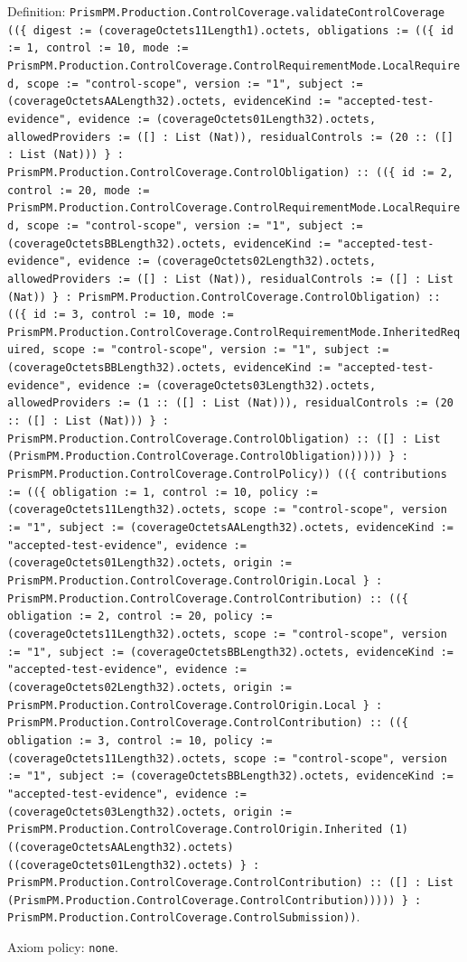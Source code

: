 \documentclass[11pt]{article}
\begin{document}
\noindent Definition: \texttt{PrismPM.Production.ControlCoverage.validateControlCoverage ((\{ digest := (coverageOctets11Length1).octets, obligations := ((\{ id := 1, control := 10, mode := PrismPM.Production.ControlCoverage.ControlRequirementMode.LocalRequired, scope := "control-scope", version := "1", subject := (coverageOctetsAALength32).octets, evidenceKind := "accepted-test-evidence", evidence := (coverageOctets01Length32).octets, allowedProviders := ([] : List (Nat)), residualControls := (20 :: ([] : List (Nat))) \} : PrismPM.Production.ControlCoverage.ControlObligation) :: ((\{ id := 2, control := 20, mode := PrismPM.Production.ControlCoverage.ControlRequirementMode.LocalRequired, scope := "control-scope", version := "1", subject := (coverageOctetsBBLength32).octets, evidenceKind := "accepted-test-evidence", evidence := (coverageOctets02Length32).octets, allowedProviders := ([] : List (Nat)), residualControls := ([] : List (Nat)) \} : PrismPM.Production.ControlCoverage.ControlObligation) :: ((\{ id := 3, control := 10, mode := PrismPM.Production.ControlCoverage.ControlRequirementMode.InheritedRequired, scope := "control-scope", version := "1", subject := (coverageOctetsBBLength32).octets, evidenceKind := "accepted-test-evidence", evidence := (coverageOctets03Length32).octets, allowedProviders := (1 :: ([] : List (Nat))), residualControls := (20 :: ([] : List (Nat))) \} : PrismPM.Production.ControlCoverage.ControlObligation) :: ([] : List (PrismPM.Production.ControlCoverage.ControlObligation))))) \} : PrismPM.Production.ControlCoverage.ControlPolicy)) ((\{ contributions := ((\{ obligation := 1, control := 10, policy := (coverageOctets11Length32).octets, scope := "control-scope", version := "1", subject := (coverageOctetsAALength32).octets, evidenceKind := "accepted-test-evidence", evidence := (coverageOctets01Length32).octets, origin := PrismPM.Production.ControlCoverage.ControlOrigin.Local \} : PrismPM.Production.ControlCoverage.ControlContribution) :: ((\{ obligation := 2, control := 20, policy := (coverageOctets11Length32).octets, scope := "control-scope", version := "1", subject := (coverageOctetsBBLength32).octets, evidenceKind := "accepted-test-evidence", evidence := (coverageOctets02Length32).octets, origin := PrismPM.Production.ControlCoverage.ControlOrigin.Local \} : PrismPM.Production.ControlCoverage.ControlContribution) :: ((\{ obligation := 3, control := 10, policy := (coverageOctets11Length32).octets, scope := "control-scope", version := "1", subject := (coverageOctetsBBLength32).octets, evidenceKind := "accepted-test-evidence", evidence := (coverageOctets03Length32).octets, origin := PrismPM.Production.ControlCoverage.ControlOrigin.Inherited (1) ((coverageOctetsAALength32).octets) ((coverageOctets01Length32).octets) \} : PrismPM.Production.ControlCoverage.ControlContribution) :: ([] : List (PrismPM.Production.ControlCoverage.ControlContribution))))) \} : PrismPM.Production.ControlCoverage.ControlSubmission))}.\par
\noindent Axiom policy: \texttt{none}.\par
\end{document}
